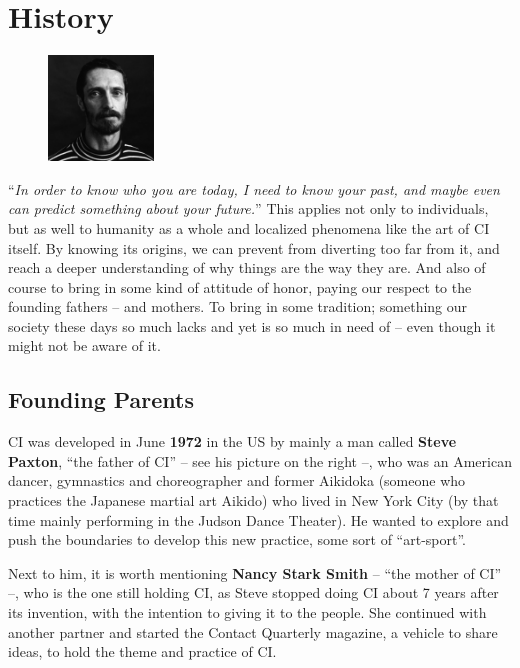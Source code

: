 \section{History}\label{sec:history}

\begin{figure}
\centering
\includegraphics[width=0.25\textwidth]{images/history}
\end{figure}

``\textit{In order to know who you are today, I need to know your past, and maybe even can predict something about your future.}''
This applies not only to individuals, but as well to humanity as a whole and localized phenomena like the art of CI itself.
By knowing its origins, we can prevent from diverting too far from it, and reach a deeper understanding of why things are the way they are.
And also of course to bring in some kind of attitude of honor, paying our respect to the founding fathers -- and mothers.
To bring in some tradition; something our society these days so much lacks and yet is so much in need of -- even though it might not be aware of it.

\subsection{Founding Parents}\label{subsec:founding-parents}

CI was developed in June \textbf{1972} in the US by mainly a man called \textbf{Steve Paxton}, ``the father of CI'' -- see his picture on the right --, who was an American dancer, gymnastics and choreographer and former Aikidoka (someone who practices the Japanese martial art Aikido) who lived in New York City (by that time mainly performing in the Judson Dance Theater).
He wanted to explore and push the boundaries to develop this new practice, some sort of ``art-sport''.

Next to him, it is worth mentioning \textbf{Nancy Stark Smith} -- ``the mother of CI'' --, who is the one still holding CI, as Steve stopped doing CI about 7 years after its invention, with the intention to giving it to the people.
She continued with another partner and started the Contact Quarterly magazine, a vehicle to share ideas, to hold the theme and practice of CI\@.

